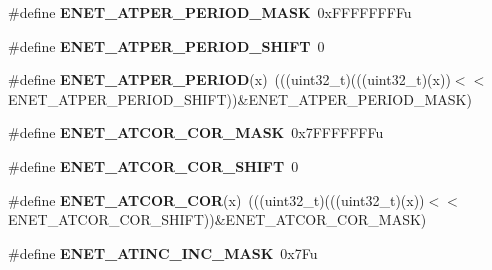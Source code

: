 \begin{DoxyCompactItemize}
\item 
\#define {\bfseries E\+N\+E\+T\+\_\+\+A\+T\+P\+E\+R\+\_\+\+P\+E\+R\+I\+O\+D\+\_\+\+M\+A\+SK}~0x\+F\+F\+F\+F\+F\+F\+F\+Fu\hypertarget{group__ENET__Register__Masks_ga86f89e80c9b16d19744517af3d775f57}{}\label{group__ENET__Register__Masks_ga86f89e80c9b16d19744517af3d775f57}

\item 
\#define {\bfseries E\+N\+E\+T\+\_\+\+A\+T\+P\+E\+R\+\_\+\+P\+E\+R\+I\+O\+D\+\_\+\+S\+H\+I\+FT}~0\hypertarget{group__ENET__Register__Masks_gadef7d222ae0f44afa4379b3a27e89978}{}\label{group__ENET__Register__Masks_gadef7d222ae0f44afa4379b3a27e89978}

\item 
\#define {\bfseries E\+N\+E\+T\+\_\+\+A\+T\+P\+E\+R\+\_\+\+P\+E\+R\+I\+OD}(x)~(((uint32\+\_\+t)(((uint32\+\_\+t)(x))$<$$<$E\+N\+E\+T\+\_\+\+A\+T\+P\+E\+R\+\_\+\+P\+E\+R\+I\+O\+D\+\_\+\+S\+H\+I\+FT))\&E\+N\+E\+T\+\_\+\+A\+T\+P\+E\+R\+\_\+\+P\+E\+R\+I\+O\+D\+\_\+\+M\+A\+SK)\hypertarget{group__ENET__Register__Masks_gab2418a9dfbf8e0b5c7dd20714c14f791}{}\label{group__ENET__Register__Masks_gab2418a9dfbf8e0b5c7dd20714c14f791}

\item 
\#define {\bfseries E\+N\+E\+T\+\_\+\+A\+T\+C\+O\+R\+\_\+\+C\+O\+R\+\_\+\+M\+A\+SK}~0x7\+F\+F\+F\+F\+F\+F\+Fu\hypertarget{group__ENET__Register__Masks_gacbd6f1547546f95562a646e40ab095d3}{}\label{group__ENET__Register__Masks_gacbd6f1547546f95562a646e40ab095d3}

\item 
\#define {\bfseries E\+N\+E\+T\+\_\+\+A\+T\+C\+O\+R\+\_\+\+C\+O\+R\+\_\+\+S\+H\+I\+FT}~0\hypertarget{group__ENET__Register__Masks_ga5b25c79c73597f4700107d56a1cdcd91}{}\label{group__ENET__Register__Masks_ga5b25c79c73597f4700107d56a1cdcd91}

\item 
\#define {\bfseries E\+N\+E\+T\+\_\+\+A\+T\+C\+O\+R\+\_\+\+C\+OR}(x)~(((uint32\+\_\+t)(((uint32\+\_\+t)(x))$<$$<$E\+N\+E\+T\+\_\+\+A\+T\+C\+O\+R\+\_\+\+C\+O\+R\+\_\+\+S\+H\+I\+FT))\&E\+N\+E\+T\+\_\+\+A\+T\+C\+O\+R\+\_\+\+C\+O\+R\+\_\+\+M\+A\+SK)\hypertarget{group__ENET__Register__Masks_ga97bb4a4c75d59a21afb9972077f03374}{}\label{group__ENET__Register__Masks_ga97bb4a4c75d59a21afb9972077f03374}

\item 
\#define {\bfseries E\+N\+E\+T\+\_\+\+A\+T\+I\+N\+C\+\_\+\+I\+N\+C\+\_\+\+M\+A\+SK}~0x7\+Fu\hypertarget{group__ENET__Register__Masks_ga658c4082b327e6291ea190f5d2e7b8b6}{}\label{group__ENET__Register__Masks_ga658c4082b327e6291ea190f5d2e7b8b6}


\end{DoxyCompactItemize}
